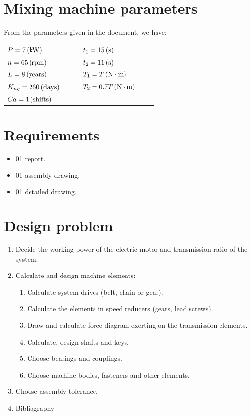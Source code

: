 \section{Mixing machine parameters}
From the parameters given in the document, we have:\\
\begin{tabular}{p{0.4\linewidth}p{0.4\linewidth}}
	$ P=7 \, (\mathrm{kW})$ & $ t_1=15\, (\mathrm{s}) $\\
	$ n=65\, (\mathrm{rpm}) $ & $ t_2=11\, (\mathrm{s}) $\\
	$ L=8\, (\mathrm{years}) $ & $ T_1=T\, (\mathrm{N\cdot m}) $\\
	$ K_{ng}=260\, (\mathrm{days}) $ & $ T_2=0.7T\, (\mathrm{N\cdot m}) $\\
	$ Ca=1\, (\mathrm{shifts}) $&\\
\end{tabular}

\section{Requirements}
\begin{itemize}
	\item 01 report.
	\item 01 assembly drawing.
	\item 01 detailed drawing.
\end{itemize}

\section{Design problem}
\begin{enumerate}
	\item Decide the working power of the electric motor and transmission ratio of the system.
	\item Calculate and design machine elements:
	\begin{enumerate}
		\item Calculate system drives (belt, chain or gear).
		\item Calculate the elements in speed reducers (gears, lead screws).
		\item Draw and calculate force diagram exerting on the transmission elements.
		\item Calculate, design shafts and keys.
		\item Choose bearings and couplings.
		\item Choose machine bodies, fasteners and other elements.
	\end{enumerate}
	\item Choose assembly tolerance.
	\item Bibliography
\end{enumerate}
